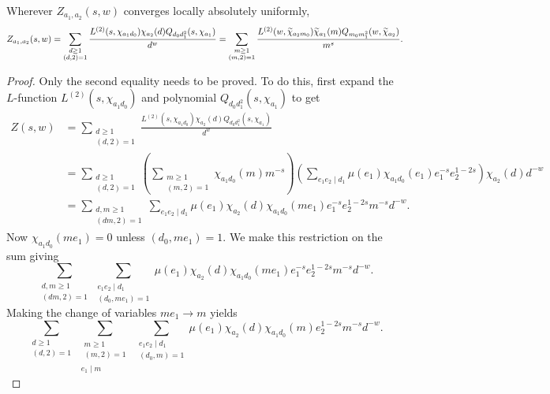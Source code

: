 \documentclass[12pt,reqno,oneside]{amsart}
\begin{document}
    \begin{theorem}[Interchange]
        Wherever $Z_{a_{1},a_{2}}(s,w)$ converges locally absolutely uniformly,
        \[
            Z_{a_{1},a_{2}}(s,w) = \sum_{\substack{d \ge 1 \\ (d,2) = 1}}\frac{L^{(2)}(s,\chi_{a_{1}d_{0}})\chi_{a_{2}}(d)Q_{d_{0}d_{1}^{2}}(s,\chi_{a_{1}})}{d^{w}} = \sum_{\substack{m \ge 1 \\ (m,2) = 1}}\frac{L^{(2)}(w,\widetilde{\chi}_{a_{2}m_{0}})\widetilde{\chi}_{a_{1}}(m)Q_{m_{0}m_{1}^{2}}(w,\widetilde{\chi}_{a_{2}})}{m^{s}}.
        \]
    \end{theorem}
    \begin{proof}
        Only the second equality needs to be proved. To do this, first expand the $L$-function $L^{(2)}(s,\chi_{a_{1}d_{0}})$ and polynomial $Q_{d_{0}d_{1}^{2}}(s,\chi_{a_{1}})$ to get
        \begin{align*}
            Z(s,w) &= \sum_{\substack{d \ge 1 \\ (d,2) = 1}}\frac{L^{(2)}(s,\chi_{a_{1}d_{0}})\chi_{a_{2}}(d)Q_{d_{0}d_{1}^{2}}(s,\chi_{a_{1}})}{d^{w}} \\
            &= \sum_{\substack{d \ge 1 \\ (d,2) = 1}}\left(\sum_{\substack{m \ge 1 \\ (m,2) = 1}}\chi_{a_{1}d_{0}}(m)m^{-s}\right)\left(\sum_{e_{1}e_{2} \mid d_{1}}\mu(e_{1})\chi_{a_{1}d_{0}}(e_{1})e_{1}^{-s}e_{2}^{1-2s}\right)\chi_{a_{2}}(d)d^{-w} \\
            &= \sum_{\substack{d,m \ge 1 \\ (dm,2) = 1}}\sum_{e_{1}e_{2} \mid d_{1}}\mu(e_{1})\chi_{a_{2}}(d)\chi_{a_{1}d_{0}}(me_{1})e_{1}^{-s}e_{2}^{1-2s}m^{-s}d^{-w}.
        \end{align*}
        Now $\chi_{a_{1}d_{0}}(me_{1}) = 0$ unless $(d_{0},me_{1}) = 1$. We make this restriction on the sum giving
        \[
            \sum_{\substack{d,m \ge 1 \\ (dm,2) = 1}}\sum_{\substack{e_{1}e_{2} \mid d_{1} \\ (d_{0},me_{1}) = 1}}\mu(e_{1})\chi_{a_{2}}(d)\chi_{a_{1}d_{0}}(me_{1})e_{1}^{-s}e_{2}^{1-2s}m^{-s}d^{-w}.
        \]
        Making the change of variables $me_{1} \to m$ yields
        \[
            \sum_{\substack{d \ge 1 \\ (d,2) = 1}}\sum_{\substack{\substack{m \ge 1 \\ (m,2) = 1} \\ e_{1} \mid m}}\sum_{\substack{e_{1}e_{2} \mid d_{1} \\ (d_{0},m) = 1}}\mu(e_{1})\chi_{a_{2}}(d)\chi_{a_{1}d_{0}}(m)e_{2}^{1-2s}m^{-s}d^{-w}.
\]
\end{proof}
\end{document}
